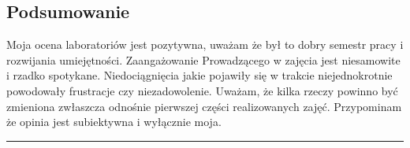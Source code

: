 \documentclass[a4paper,11pt]{article}
\newcommand{\linia}{\rule{\linewidth}{0.4mm}}
\begin{document}
\subsection{Podsumowanie}
Moja ocena laboratoriów jest pozytywna, uważam że był to dobry semestr pracy i rozwijania umiejętności. Zaangażowanie Prowadzącego w zajęcia jest niesamowite i rzadko spotykane. Niedociągnięcia jakie pojawiły się w trakcie niejednokrotnie powodowały frustracje czy niezadowolenie. Uważam, że kilka rzeczy powinno być zmieniona zwłaszcza odnośnie pierwszej części realizowanych zajęć. Przypominam że opinia jest subiektywna i wyłącznie moja.

\noindent\linia
\end{document}
